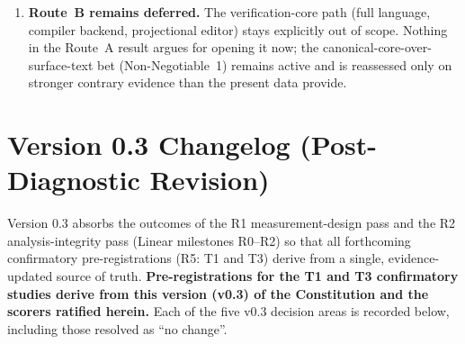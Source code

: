 \documentclass[11pt]{article}
\begin{document}
\begin{enumerate}
  \item \textbf{Route~B remains deferred.} The verification-core path
    (full language, compiler backend, projectional editor) stays
    explicitly out of scope. Nothing in the Route~A result argues for
    opening it now; the canonical-core-over-surface-text bet
    (Non-Negotiable~1) remains active and is reassessed only on stronger
    contrary evidence than the present data provide.
\end{enumerate}

\vspace{0.5em}

\section*{Version 0.3 Changelog (Post-Diagnostic Revision)}

Version 0.3 absorbs the outcomes of the R1 measurement-design pass and the
R2 analysis-integrity pass (Linear milestones R0--R2) so that all
forthcoming confirmatory pre-registrations (R5: T1 and T3) derive from a
single, evidence-updated source of truth. \textbf{Pre-registrations for the
T1 and T3 confirmatory studies derive from this version (v0.3) of the
Constitution and the scorers ratified herein.} Each of the five v0.3
decision areas is recorded below, including those resolved as ``no change''.
\end{document}
